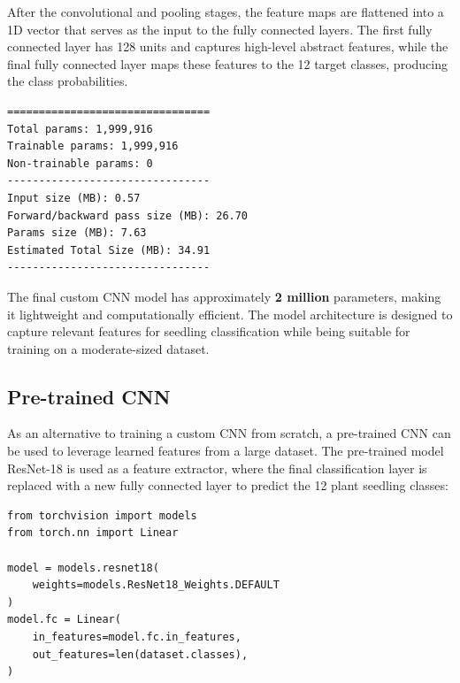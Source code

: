 After the convolutional and pooling stages, the feature maps are flattened into a 1D vector that serves as the input to the fully connected layers. The first fully connected layer has 128 units and captures high-level abstract features, while the final fully connected layer maps these features to the 12 target classes, producing the class probabilities.

\begin{minipage}{0.9\linewidth}\begin{lstlisting}[language={},caption={Custom CNN model summary.},label={lst:custom-cnn-summary}]
================================
Total params: 1,999,916
Trainable params: 1,999,916
Non-trainable params: 0
--------------------------------
Input size (MB): 0.57
Forward/backward pass size (MB): 26.70
Params size (MB): 7.63
Estimated Total Size (MB): 34.91
--------------------------------
\end{lstlisting}\end{minipage}

The final custom CNN model has approximately \textbf{2 million} parameters, making it lightweight and computationally efficient. The model architecture is designed to capture relevant features for seedling classification while being suitable for training on a moderate-sized dataset.

\subsection{Pre-trained CNN}

As an alternative to training a custom CNN from scratch, a pre-trained CNN can be used to leverage learned features from a large dataset. The pre-trained model ResNet-18 \cite{DBLP:journals/corr/HeZRS15} is used as a feature extractor, where the final classification layer is replaced with a new fully connected layer to predict the 12 plant seedling classes:

\begin{minipage}{0.9\linewidth}\begin{lstlisting}[caption={Replacing the final classification layer of a pre-trained ResNet-18 model.},label={lst:pre-trained-cnn}]
from torchvision import models
from torch.nn import Linear

model = models.resnet18(
    weights=models.ResNet18_Weights.DEFAULT
)
model.fc = Linear(
    in_features=model.fc.in_features,
    out_features=len(dataset.classes),
)
\end{lstlisting}\end{minipage}

